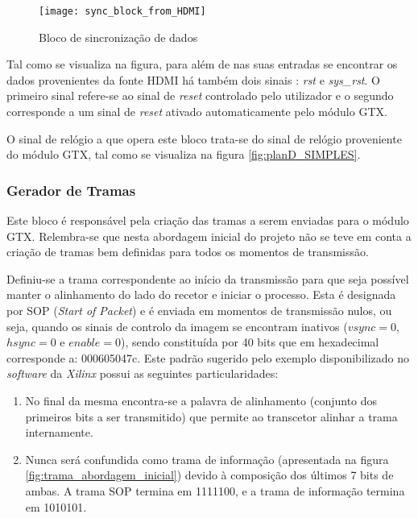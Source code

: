 \begin{figure}[h!]
	\begin{center}
		\leavevmode
		\texttt{[image: sync\_block\_from\_HDMI]}
		\captionsetup{width=1.0\linewidth}
		\caption[Bloco de sincronização de dados]{Bloco de sincronização de dados}
		\label{fig:sync_block}
	\end{center}
\end{figure}

Tal como se visualiza na figura, para além de nas suas entradas se encontrar os dados provenientes da fonte HDMI há também dois sinais : \textit{rst} e \textit{sys\_rst}. O primeiro sinal refere-se ao sinal de \textit{reset} controlado pelo utilizador e o segundo corresponde a um sinal de \textit{reset} ativado automaticamente pelo módulo GTX.

O sinal de relógio a que opera este bloco trata-se do sinal de relógio proveniente do módulo GTX, tal como se visualiza na figura \ref{fig:planD_SIMPLES}.

\subsubsection*{Gerador de Tramas} \label{subsub:serial_frameGenerator}

Este bloco é responsável pela criação das tramas a serem enviadas para o módulo GTX. Relembra-se que nesta abordagem inicial do projeto não se teve em conta a criação de tramas bem definidas para todos os momentos de transmissão. 

Definiu-se a trama correspondente ao início da transmissão para que seja possível manter o alinhamento do lado do recetor e iniciar o processo. Esta é designada por  SOP (\textit{Start of Packet}) e é enviada em momentos de transmissão nulos, ou seja, quando os sinais de controlo da imagem se encontram inativos ($vsync = 0$, $hsync = 0$ e $enable = 0$), sendo constituída por 40 bits que em hexadecimal corresponde a: 000605047c. Este padrão sugerido pelo exemplo disponibilizado no \textit{software} da \textit{Xilinx} possui as seguintes particularidades:

\begin{enumerate}
	\item No final da mesma encontra-se a palavra de alinhamento (conjunto dos primeiros bits a ser transmitido) que permite ao transcetor alinhar a trama internamente.
	\item Nunca será confundida como trama de informação (apresentada na figura \ref{fig:trama_abordagem_inicial}) devido à composição dos últimos 7  bits de ambas. A trama SOP termina em 1111100, e a trama de informação termina em 1010101.
\end{enumerate}



